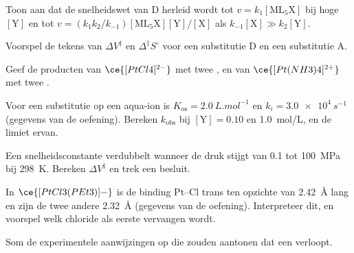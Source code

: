 \begin{exercise}[$\star$]\label{exo:b3:complex-mechanisms:2}
Toon aan dat de snelheidswet van D herleid wordt tot $v = k_1[\mathrm{ML_5X}]$ bij hoge $[\mathrm Y]$ en tot $v = (k_1k_2/k_{-1})
[\mathrm{ML_5X}][\mathrm Y]/[\mathrm X]$ als $k_{-1}[\mathrm X] \gg k_2[\mathrm Y]$.
\end{exercise}

\begin{exercise}[$\star$]\label{exo:b3:complex-mechanisms:3}
Voorspel de tekens van $\Delta V^{\ddagger}$ en $\Delta^{\ddagger}S^\circ$ voor een substitutie D en een substitutie A.
\end{exercise}

\begin{exercise}[$\star$]\label{exo:b3:complex-mechanisms:4}
Geef de producten van $\ce{[PtCl4]^{2-}}$ met twee , en van $\ce{[Pt(NH3)4]^{2+}}$ met twee .
\end{exercise}

\begin{exercise}[$\star\star$]\label{exo:b3:complex-mechanisms:5}
Voor een substitutie op een aqua-ion is $K_{\mathrm{os}} = \qty{2.0}{L.mol^{-1}}$ en $k_i = \qty{3.0e4}{s^{-1}}$ (gegevens van
de oefening). Bereken $k_{\mathrm{obs}}$ bij $[\mathrm Y] = 0.10$ en \qty{1.0}{mol/L}, en de limiet ervan.
\end{exercise}

\begin{exercise}[$\star\star$]\label{exo:b3:complex-mechanisms:6}
Een snelheidsconstante verdubbelt wanneer de druk stijgt van 0.1 tot \qty{100}{MPa} bij \qty{298}{K}.
Bereken $\Delta V^{\ddagger}$ en trek een besluit.
\end{exercise}

\begin{exercise}[$\star\star$]\label{exo:b3:complex-mechanisms:7}
In $\ce{[PtCl3(PEt3)]-}$ is de binding Pt--Cl trans ten opzichte van  \qty{2.42}{\angstrom} lang en zijn de twee andere \qty{2.32}{\angstrom}
(gegevens van de oefening). Interpreteer dit, en voorspel welk chloride
als eerste vervangen wordt.
\end{exercise}

\begin{exercise}[$\star\star$]\label{exo:b3:complex-mechanisms:8}
Som de experimentele aanwijzingen op die zouden aantonen dat een
 verloopt.
\end{exercise}

